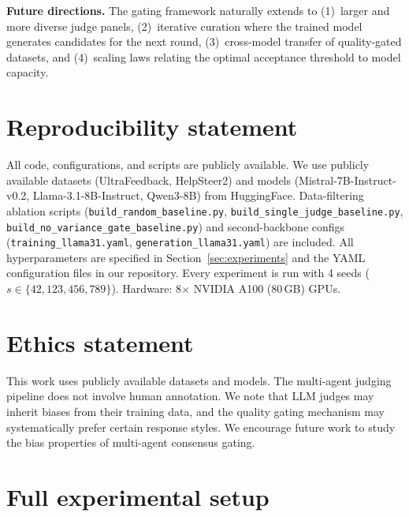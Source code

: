 \documentclass{article}
\begin{document}
\textbf{Future directions.} The gating framework naturally extends to (1)~larger and more diverse judge panels, (2)~iterative curation where the trained model generates candidates for the next round, (3)~cross-model transfer of quality-gated datasets, and (4)~scaling laws relating the optimal acceptance threshold to model capacity.


\section*{Reproducibility statement}

All code, configurations, and scripts are publicly available. We use publicly available datasets (UltraFeedback, HelpSteer2) and models (Mistral-7B-Instruct-v0.2, Llama-3.1-8B-Instruct, Qwen3-8B) from HuggingFace. Data-filtering ablation scripts (\texttt{build\_random\_baseline.py}, \texttt{build\_single\_judge\_baseline.py}, \texttt{build\_no\_variance\_gate\_baseline.py}) and second-backbone configs (\texttt{training\_llama31.yaml}, \texttt{generation\_llama31.yaml}) are included. All hyperparameters are specified in Section~\ref{sec:experiments} and the YAML configuration files in our repository. Every experiment is run with 4 seeds ($s \in \{42, 123, 456, 789\}$). Hardware: 8$\times$ NVIDIA A100 (80\,GB) GPUs.

\section*{Ethics statement}

This work uses publicly available datasets and models. The multi-agent judging pipeline does not involve human annotation. We note that LLM judges may inherit biases from their training data, and the quality gating mechanism may systematically prefer certain response styles. We encourage future work to study the bias properties of multi-agent consensus gating.





\appendix

\section{Full experimental setup}
\label{app:setup}
\end{document}
